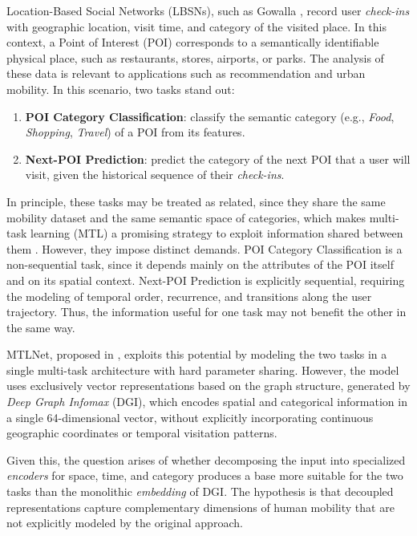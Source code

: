 Location-Based Social Networks (LBSNs), such as Gowalla \cite{cho2011friendship,jure2014snap}, record user \textit{check-ins} with geographic location, visit time, and category of the visited place. In this context, a Point of Interest (POI) corresponds to a semantically identifiable physical place, such as restaurants, stores, airports, or parks. The analysis of these data is relevant to applications such as recommendation and urban mobility. In this scenario, two tasks stand out:

\begin{enumerate}
    \item \textbf{POI Category Classification}: classify the semantic category (e.g., \textit{Food}, \textit{Shopping}, \textit{Travel}) of a POI from its features.
    \item \textbf{Next-POI Prediction}: predict the category of the next POI that a user will visit, given the historical sequence of their \textit{check-ins}.
\end{enumerate}

In principle, these tasks may be treated as related, since they share the same mobility dataset and the same semantic space of categories, which makes multi-task learning (MTL) a promising strategy to exploit information shared between them \cite{caruana1997multitask}. However, they impose distinct demands. POI Category Classification is a non-sequential task, since it depends mainly on the attributes of the POI itself and on its spatial context. Next-POI Prediction is explicitly sequential, requiring the modeling of temporal order, recurrence, and transitions along the user trajectory. Thus, the information useful for one task may not benefit the other in the same way.

MTLNet, proposed in \cite{silva2025mtlnet}, exploits this potential by modeling the two tasks in a single multi-task architecture with hard parameter sharing. However, the model uses exclusively vector representations based on the graph structure, generated by \textit{Deep Graph Infomax} (DGI), which encodes spatial and categorical information in a single 64-dimensional vector, without explicitly incorporating continuous geographic coordinates or temporal visitation patterns.

Given this, the question arises of whether decomposing the input into specialized \textit{encoders} for space, time, and category produces a base more suitable for the two tasks than the monolithic \textit{embedding} of DGI. The hypothesis is that decoupled representations capture complementary dimensions of human mobility that are not explicitly modeled by the original approach.

